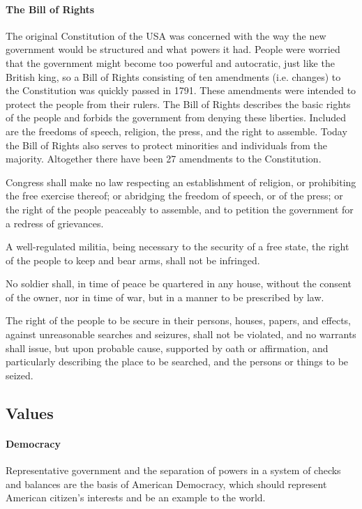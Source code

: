 \documentclass[10pt]{article}
\begin{document}
\paragraph{The Bill of Rights}
The original Constitution of the USA was concerned with the way the new government would be
structured and what powers it had. People were worried that the government might become too
powerful and autocratic, just like the British king, so a Bill of Rights consisting of ten amendments
(i.e. changes) to the Constitution was quickly passed in 1791. These amendments were intended to
protect the people from their rulers. The Bill of Rights describes the basic rights of the people and
forbids the government from denying these liberties. Included are the freedoms of speech, religion,
the press, and the right to assemble. Today the Bill of Rights also serves to protect minorities and
individuals from the majority. Altogether there have been 27 amendments to the Constitution.
\begin{example}
Congress shall make no law respecting an establishment of religion, or prohibiting the free exercise thereof; or abridging
the freedom of speech, or of the press; or the right of the people peaceably to assemble, and to petition the government
for a redress of grievances.

A well-regulated militia, being necessary to the security of a free state, the right of the people to keep and bear arms, shall
not be infringed.

No soldier shall, in time of peace be quartered in any house, without the consent of the owner, nor in time of war, but in a
manner to be prescribed by law.

The right of the people to be secure in their persons, houses, papers, and effects, against unreasonable searches and
seizures, shall not be violated, and no warrants shall issue, but upon probable cause, supported by oath or affirmation, and
particularly describing the place to be searched, and the persons or things to be seized.
\end{example}
\subsection{Values}
	\label{ssec:usa@values}
\paragraph{Democracy}
Representative government and the separation of powers in a system of checks
and balances are the basis of American Democracy, which should represent American
citizen's interests and be an example to the world.
\end{document}
